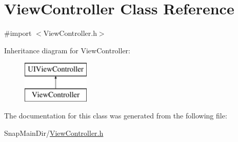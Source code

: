 \hypertarget{interface_view_controller}{}\section{View\+Controller Class Reference}
\label{interface_view_controller}


{\ttfamily \#import $<$View\+Controller.\+h$>$}

Inheritance diagram for View\+Controller\+:\begin{figure}[H]
\begin{center}
\leavevmode
\includegraphics[height=2.000000cm]{interface_view_controller}
\end{center}
\end{figure}


The documentation for this class was generated from the following file\+:\begin{DoxyCompactItemize}
\item 
Snap\+Main\+Dir/\hyperlink{_view_controller_8h}{View\+Controller.\+h}\end{DoxyCompactItemize}
